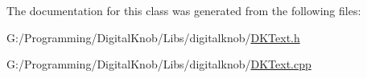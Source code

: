 The documentation for this class was generated from the following files\-:\begin{DoxyCompactItemize}
\item 
G\-:/\-Programming/\-Digital\-Knob/\-Libs/digitalknob/\hyperlink{_d_k_text_8h}{D\-K\-Text.\-h}\item 
G\-:/\-Programming/\-Digital\-Knob/\-Libs/digitalknob/\hyperlink{_d_k_text_8cpp}{D\-K\-Text.\-cpp}\end{DoxyCompactItemize}
